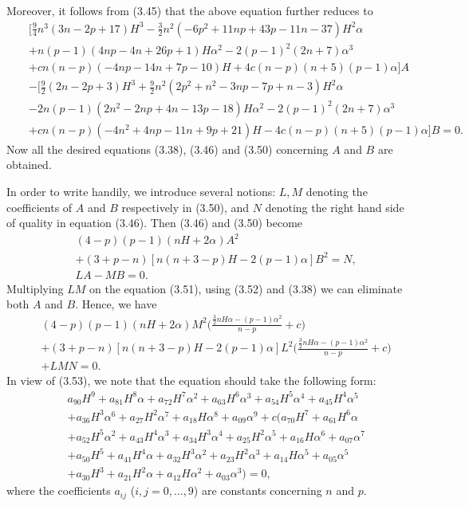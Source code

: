 \documentclass[twoside,reqno,A4]{amsart}
\theoremstyle{definition}
\theoremstyle{remark}
\numberwithin{equation}{section}
\begin{document}
Moreover, it follows from (3.45) that the above equation further
reduces to
\begin{eqnarray}
&&\Big[\frac{9}{4}n^3(3n-2p+17)H^3-\frac{3}{2}n^2(-6p^2+11np+43p-11n-37)H^2\alpha\\
&&+n(p-1)(4np-4n+26p+1)H\alpha^2-2(p-1)^2(2n+7)\alpha^3\nonumber\\
&&+cn(n-p)(-4np-14n+7p-10)H+4c(n-p)(n+5)(p-1)\alpha\Big]A\nonumber\\
&&-\Big[\frac{9}{2}(2n-2p+3)H^3+\frac{9}{2}n^2(2p^2+n^2-3np-7p+n-3)H^2\alpha\nonumber\\
&&-2n(p-1)(2n^2-2np+4n-13p-18)H\alpha^2-2(p-1)^2(2n+7)\alpha^3\nonumber\\
&&+cn(n-p)(-4n^2+4np-11n+9p+21)H-4c(n-p)(n+5)(p-1)\alpha\Big]B=0.\nonumber
\end{eqnarray}
Now all the desired equations (3.38), (3.46) and (3.50) concerning
$A$ and $B$ are obtained.

In order to write handily, we introduce several notions: $L, M$
denoting the coefficients of $A$ and $B$ respectively in (3.50), and
$N$ denoting the right hand side of quality in equation (3.46). Then
(3.46) and (3.50) become
\begin{eqnarray}
&&(4-p)(p-1)(nH+2\alpha)A^2\\
&&+(3+p-n)[n(n+3-p)H-2(p-1)\alpha]B^2=N,\nonumber\\
&&LA-MB=0.
\end{eqnarray}
Multiplying $LM$ on the equation (3.51), using (3.52) and (3.38) we
can eliminate both $A$ and $B$. Hence, we have
\begin{eqnarray}
&&(4-p)(p-1)(nH+2\alpha)M^2\big(\frac{\frac{3}{2}nH\alpha-(p-1)\alpha^2}{n-p}+c\big)\nonumber\\
&&+(3+p-n)[n(n+3-p)H-2(p-1)\alpha]L^2\big(\frac{\frac{3}{2}nH\alpha-(p-1)\alpha^2}{n-p}+c\big)\nonumber\\
&&+LMN=0.
\end{eqnarray}
In view of (3.53), we note that the equation should take the
following form:
\begin{eqnarray}
&&a_{90}H^9+a_{81}H^8\alpha+a_{72}H^7\alpha^2+a_{63}H^6\alpha^3+a_{54}H^5\alpha^4
+a_{45}H^4\alpha^5\nonumber\\
&&+a_{36}H^3\alpha^6+a_{27}H^2\alpha^7+a_{18}H\alpha^8+a_{09}\alpha^9+c(a_{70}H^7+a_{61}H^6\alpha\nonumber\\
&&+a_{52}H^5\alpha^2+a_{43}H^4\alpha^3+a_{34}H^3\alpha^4+a_{25}H^2\alpha^5+a_{16}H\alpha^6+a_{07}\alpha^7\nonumber\\
&&+a_{50}H^5+a_{41}H^4\alpha+a_{32}H^3\alpha^2+a_{23}H^2\alpha^3+a_{14}H\alpha^5+a_{05}\alpha^5\nonumber\\
&&+a_{30}H^3+a_{21}H^2\alpha+a_{12}H\alpha^2+a_{03}\alpha^3)=0,
\end{eqnarray}
where the coefficients $a_{ij}$ ($i, j=0,\ldots,9$) are constants
concerning $n$ and $p$.
\end{document}
